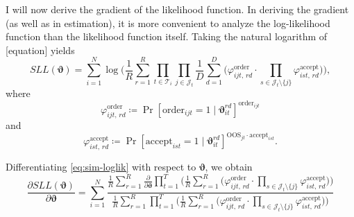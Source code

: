 \documentclass[12pt]{article}
\theoremstyle{plain}
\begin{document}
I will now derive the gradient of the likelihood function. In deriving the gradient (as well as in estimation), it is more convenient to analyze the log-likelihood function than the likelihood function itself. Taking the natural logarithm of [equation] yields 
\begin{equation}
  SLL(\bm{\vartheta}) = \sum_{i=1}^N \log \Bigg( \frac{1}{R} \sum_{r=1}^R \prod_{t \in \mathcal{T}_i} \prod_{j \in \mathcal{J}_t}  \frac{1}{D} \sum_{d=1}^D \bigg( \varphi^{\text{order}}_{ijt, \, rd} 
  \cdot  \prod_{s \in \mathcal{J}_t \setminus \{j\} }\varphi^{\text{accept}}_{ist, \, rd} \bigg)  \Bigg), \label{eq:sim-loglik}
\end{equation}
where
\begin{equation*}
   \varphi^{\text{order}}_{ijt, \, rd} \coloneq \operatorname{Pr} [ \text{order}_{ijt} = 1 \mid \bm{\vartheta}_{it}^{rd} ]^{\text{order}_{ijt}}
\end{equation*}
and 
\begin{equation*}
   \varphi^{\text{accept}}_{ist, \, rd} \coloneq \operatorname{Pr} [\text{accept}_{ist} = 1 \mid \bm{\vartheta}_{it}^{rd}  ]^{\text{OOS}_{jt} \cdot \text{accept}_{ist}}.
\end{equation*}

Differentiating \cref{eq:sim-loglik} with respect to \(\bm{\vartheta}\), we obtain 
\begin{equation}
  \frac{\partial SLL(\bm{\vartheta})}{\partial \bm{\vartheta}} = \sum_{i=1}^N \frac{\frac{1}{R} \sum_{r=1}^R \frac{\partial}{\partial \bm{\vartheta}} \prod_{t=1}^T \Big( \frac{1}{R} \sum_{r=1}^R \big( \varphi^{\text{order}}_{ijt, \, rd} 
  \cdot  \prod_{s \in \mathcal{J}_t \setminus \{j\} }\varphi^{\text{accept}}_{ist, \, rd} \big) \Big)}{\frac{1}{R} \sum_{r=1}^R \prod_{t=1}^T \Big( \frac{1}{R} \sum_{r=1}^R \big( \varphi^{\text{order}}_{ijt, \, rd} 
  \cdot  \prod_{s \in \mathcal{J}_t \setminus \{j\} }\varphi^{\text{accept}}_{ist, \, rd} \big) \Big)} \label{eq:grad-init}
\end{equation}
\end{document}
